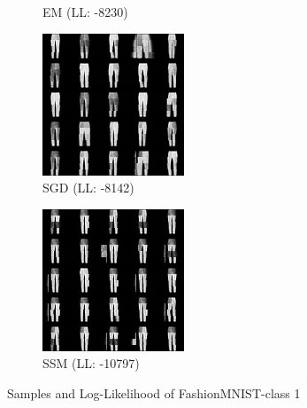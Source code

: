 \begin{figure}[H]
\begin{subfigure}[b]{0.24\textwidth}
        \caption{EM (LL: -8230)}
    \end{subfigure}
    \begin{subfigure}[b]{0.24\textwidth}
        \centering
        \includegraphics[width=\textwidth]{figures/einsum/fashion-mnist/1fashion-mnist_SGD.png} 
        \caption{SGD (LL: -8142)}
    \end{subfigure}
    \begin{subfigure}[b]{0.24\textwidth}
        \centering
        \includegraphics[width=\textwidth]{figures/einsum/fashion-mnist/1fashion-mnist_SSM.png}
        \caption{SSM (LL: -10797)}
    \end{subfigure}
    \caption{Samples and Log-Likelihood of FashionMNIST-class 1}
\end{figure}

